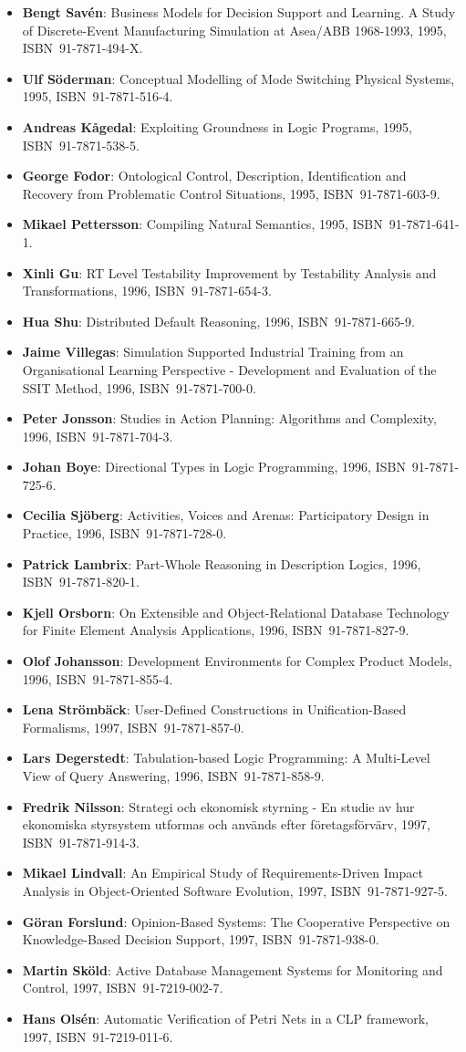 \documentclass[a4paper,showtrims,twocolumn]{memoir}
\newenvironment{theses}{
  \begin{itemize}
    \setlength{\itemsep}{0.2em}
    \setlength{\parskip}{0em}
    \setlength{\parsep}{0em}
}{
  \end{itemize}
}
\newcommand{\thesis}[5]{\item[No. #1] \textbf{#2}: #3, #4, ISBN~#5.}
\begin{document}
\begin{theses}
    \thesis{371}{Bengt Savén}{Business Models for Decision Support and Learning. A Study of Discrete-Event Manufacturing Simulation at Asea/ABB 1968-1993}{1995}{91-7871-494-X}
    \thesis{375}{Ulf Söderman}{Conceptual Modelling of Mode Switching Physical Systems}{1995}{91-7871-516-4}
    \thesis{383}{Andreas Kågedal}{Exploiting Groundness in Logic Programs}{1995}{91-7871-538-5}
    \thesis{396}{George Fodor}{Ontological Control, Description, Identification and Recovery from Problematic Control Situations}{1995}{91-7871-603-9}
    \thesis{413}{Mikael Pettersson}{Compiling Natural Semantics}{1995}{91-7871-641-1}
    \thesis{414}{Xinli Gu}{RT Level Testability Improvement by Testability Analysis and Transformations}{1996}{91-7871-654-3}
    \thesis{416}{Hua Shu}{Distributed Default Reasoning}{1996}{91-7871-665-9}
    \thesis{429}{Jaime Villegas}{Simulation Supported Industrial Training from an Organisational Learning Perspective - Development and Evaluation of the SSIT Method}{1996}{91-7871-700-0}
    \thesis{431}{Peter Jonsson}{Studies in Action Planning: Algorithms and Complexity}{1996}{91-7871-704-3}
    \thesis{437}{Johan Boye}{Directional Types in Logic Programming}{1996}{91-7871-725-6}
    \thesis{439}{Cecilia Sjöberg}{Activities, Voices and Arenas: Participatory Design in Practice}{1996}{91-7871-728-0}
    \thesis{448}{Patrick Lambrix}{Part-Whole Reasoning in Description Logics}{1996}{91-7871-820-1}
    \thesis{452}{Kjell Orsborn}{On Extensible and Object-Relational Database Technology for Finite Element Analysis Applications}{1996}{91-7871-827-9}
    \thesis{459}{Olof Johansson}{Development Environments for Complex Product Models}{1996}{91-7871-855-4}
    \thesis{461}{Lena Strömbäck}{User-Defined Constructions in Unification-Based Formalisms}{1997}{91-7871-857-0}
    \thesis{462}{Lars Degerstedt}{Tabulation-based Logic Programming: A Multi-Level View of Query Answering}{1996}{91-7871-858-9}
    \thesis{475}{Fredrik Nilsson}{Strategi och ekonomisk styrning - En studie av hur ekonomiska styrsystem utformas och används efter företagsförvärv}{1997}{91-7871-914-3}
    \thesis{480}{Mikael Lindvall}{An Empirical Study of Requirements-Driven Impact Analysis in Object-Oriented Software Evolution}{1997}{91-7871-927-5}
    \thesis{485}{Göran Forslund}{Opinion-Based Systems: The Cooperative Perspective on Knowledge-Based Decision Support}{1997}{91-7871-938-0}
    \thesis{494}{Martin Sköld}{Active Database Management Systems for Monitoring and Control}{1997}{91-7219-002-7}
    \thesis{495}{Hans Olsén}{Automatic Verification of Petri Nets in a CLP framework}{1997}{91-7219-011-6}

\end{theses}
\end{document}
